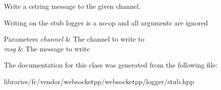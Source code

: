 Write a cstring message to the given channel. 

Writing on the stub logger is a no-\/op and all arguments are ignored


\begin{DoxyParams}{Parameters}
{\em channel} & The channel to write to \\
\hline
{\em msg} & The message to write \\
\hline
\end{DoxyParams}


The documentation for this class was generated from the following file\+:\begin{DoxyCompactItemize}
\item 
libraries/fc/vendor/websocketpp/websocketpp/logger/stub.\+hpp\end{DoxyCompactItemize}
